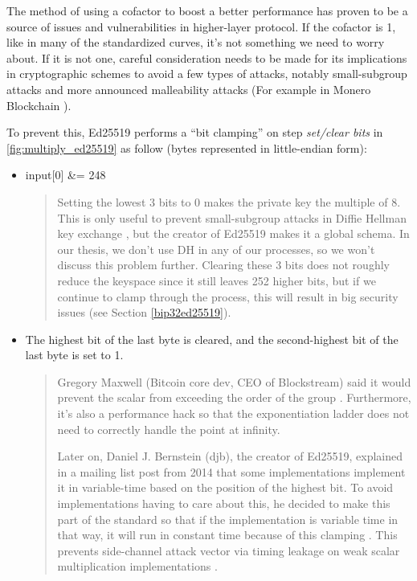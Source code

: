 \begin{adjustwidth}{1cm}{}
    The method of using a cofactor to boost a better performance \cite{DBLP:journals/iacr/BernsteinL17} has proven to be a source of issues and vulnerabilities in higher-layer protocol. If the cofactor is 1, like in many of the standardized curves, it’s not something we need to worry about. If it is not one, careful consideration needs to be made for its implications in cryptographic schemes to avoid a few types of attacks, notably small-subgroup attacks \cite{DBLP:journals/rfc/rfc2785} and more announced malleability attacks (For example in Monero Blockchain \cite{Riccardo}).

    To prevent this, Ed25519 performs a “bit clamping” on step \textit{set/clear bits} in \autoref{fig:multiply_ed25519} as follow (bytes represented in little-endian form):

    \begin{itemize}
        \item input[0] \&= 248
              \begin{quote}
                  Setting the lowest 3 bits to 0 makes the private key the multiple of 8. This is only useful to prevent small-subgroup attacks in Diffie Hellman key exchange \cite{enwiki:1057850165}, but the creator of Ed25519 makes it a global schema. In our thesis, we don't use DH in any of our processes, so we won't discuss this problem further. Clearing these 3 bits does not roughly reduce the keyspace since it still leaves 252 higher bits, but if we continue to clamp through the process, this will result in big security issues (see Section \ref{bip32ed25519}).

              \end{quote}

              \bigskip

        \item The highest bit of the last byte is cleared, and the second-highest bit of the last byte is set to 1.
              \begin{quote}

                  Gregory Maxwell (Bitcoin core dev, CEO of Blockstream) said it would prevent the scalar from exceeding the order of the group \cite{mail:000860}. Furthermore, it's also a performance hack so that the exponentiation ladder does not need to correctly handle the point at infinity.

                  Later on, Daniel J. Bernstein (djb), the creator of Ed25519, explained in a mailing list post from 2014 that some implementations implement it in variable-time based on the position of the highest bit. To avoid implementations having to care about this, he decided to make this part of the standard so that if the implementation is variable time in that way, it will run in constant time because of this clamping \cite{Bernstein:2014}. This prevents side-channel attack vector via timing leakage on weak scalar multiplication implementations \cite{DBLP:journals/iacr/BrumleyT11}.


\end{quote}
\end{itemize}
\end{adjustwidth}
